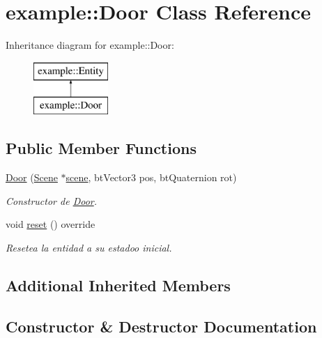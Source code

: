 \hypertarget{classexample_1_1_door}{}\section{example\+::Door Class Reference}
\label{classexample_1_1_door}
Inheritance diagram for example\+::Door\+:\begin{figure}[H]
\begin{center}
\leavevmode
\includegraphics[height=2.000000cm]{classexample_1_1_door}
\end{center}
\end{figure}
\subsection*{Public Member Functions}
\begin{DoxyCompactItemize}
\item 
\mbox{\hyperlink{classexample_1_1_door_a61f29ba333f760a222ceda4cf9dfb4e6}{Door}} (\mbox{\hyperlink{classexample_1_1_scene}{Scene}} $\ast$\mbox{\hyperlink{classexample_1_1_entity_ab851dbde4a16829f9fb77ab9a66b9f1e}{scene}}, bt\+Vector3 pos, bt\+Quaternion rot)
\begin{DoxyCompactList}\small\item\em Constructor de \mbox{\hyperlink{classexample_1_1_door}{Door}}. \end{DoxyCompactList}\item 
void \mbox{\hyperlink{classexample_1_1_door_a1743bad7a1a941423b0567a1cdc26c21}{reset}} () override
\begin{DoxyCompactList}\small\item\em Resetea la entidad a su estadoo inicial. \end{DoxyCompactList}\end{DoxyCompactItemize}
\subsection*{Additional Inherited Members}


\subsection{Constructor \& Destructor Documentation}
\mbox{\label{classexample_1_1_door_a61f29ba333f760a222ceda4cf9dfb4e6}} 
